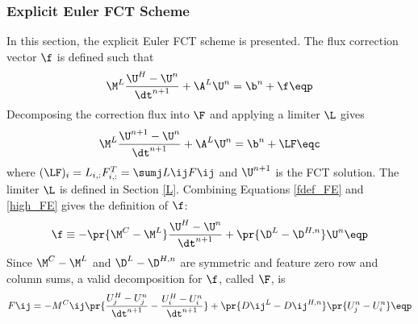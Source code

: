 \subsubsection{Explicit Euler FCT Scheme}
In this section, the explicit Euler FCT scheme is presented.
The flux correction vector $\f$ is defined such that
\begin{equation}\label{fdef_FE}
   \M^L\frac{\U^{H}-\U^n}{\dt^{n+1}} + \A^L\U^{n} = \b^n + \f \eqp
\end{equation}
Decomposing the correction flux into $\F$ and applying a limiter $\L$ gives
\begin{equation}\label{limited_FE}
   \M^L\frac{\U^{n+1}-\U^n}{\dt^{n+1}} + \A^L\U^{n} = \b^n + \LF \eqc
\end{equation}
where $(\LF)_i = L_{i,:}F_{i,:}^T = \sumj L\ij F\ij$
and $\U^{n+1}$ is the FCT solution. The limiter $\L$ is
defined in Section \ref{L}.
Combining Equations \eqref{fdef_FE} and \eqref{high_FE}
gives the definition of $\f$:
\begin{equation}\label{f_FE}
   \f \equiv -\pr{\M^C-\M^L}\frac{\U^H-\U^n}{\dt^{n+1}}
   + \pr{\D^L-\D^{H,n}}\U^n \eqp
\end{equation}
Since $\M^C-\M^L$ and $\D^L-\D^{H,n}$ are symmetric
and feature zero row and column sums, a valid decomposition for $\f$,
called $\F$, is
\begin{equation}
   F\ij = -M^C\ij\pr{\frac{U_j^H - U_j^n}{\dt^{n+1}}
   - \frac{U_i^H - U_i^n}{\dt^{n+1}}}
   + \pr{D\ij^L-D\ij^{H,n}}\pr{U_j^n - U_i^n} \eqp
\end{equation}
